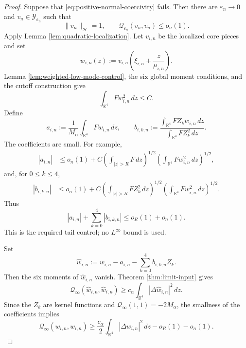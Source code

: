 \documentclass[11pt]{article}
\numberwithin{equation}{section}
\begin{document}
\begin{proof}
Suppose that \eqref{eq:positive-normal-coercivity} fails.  Then there
are $\varepsilon_n\to0$ and
$v_n\in\mathcal Y_{\varepsilon_n}$ such that
\begin{equation}\label{eq:normal-coercivity-contradiction}
\|v_n\|_{\mathcal H}=1,
\qquad
\mathcal Q_{\varepsilon_n}(v_n,v_n)\leq o_n(1).
\end{equation}
Apply Lemma \ref{lem:quadratic-localization}.  Let $v_{i,n}$ be the
localized core pieces and set
\begin{equation*}
w_{i,n}(z)
:=v_{i,n}\left(\xi_{i,n}+\frac z{\mu_{i,n}}\right).
\end{equation*}
Lemma \ref{lem:weighted-low-mode-control}, the six global moment
conditions, and the cutoff construction give
\begin{equation*}
\int_{\mathbb R^4}Fw_{i,n}^2\,dz\leq C.
\end{equation*}
Define
\begin{equation*}
a_{i,n}
:=\frac1{M_\alpha}\int_{\mathbb R^4}Fw_{i,n}\,dz,
\qquad
b_{i,k,n}
:=\frac{\int_{\mathbb R^4}FZ_kw_{i,n}\,dz}
{\int_{\mathbb R^4}FZ_k^2\,dz}.
\end{equation*}
The coefficients are small.  For example,
\begin{equation*}
\begin{aligned}
|a_{i,n}|
&\leq o_n(1)
+C\left(\int_{|z|>R}F\,dz\right)^{1/2}
\left(\int_{\mathbb R^4}Fw_{i,n}^2\,dz\right)^{1/2},
\end{aligned}
\end{equation*}
and, for $0\leq k\leq4$,
\begin{equation*}
\begin{aligned}
|b_{i,k,n}|
&\leq o_n(1)
+C\left(\int_{|z|>R}FZ_k^2\,dz\right)^{1/2}
\left(\int_{\mathbb R^4}Fw_{i,n}^2\,dz\right)^{1/2}.
\end{aligned}
\end{equation*}
Thus
\begin{equation*}
|a_{i,n}|+\sum_{k=0}^{4}|b_{i,k,n}|
\leq o_R(1)+o_n(1).
\end{equation*}
This is the required tail control; no $L^\infty$ bound is used.

Set
\begin{equation*}
\widehat w_{i,n}
:=w_{i,n}-a_{i,n}-\sum_{k=0}^{4}b_{i,k,n}Z_k.
\end{equation*}
Then the six moments of $\widehat w_{i,n}$ vanish.  Theorem
\ref{thm:limit-input} gives
\begin{equation*}
\mathcal Q_\infty(\widehat w_{i,n},\widehat w_{i,n})
\geq c_\alpha
\int_{\mathbb R^4}|\Delta\widehat w_{i,n}|^2\,dz.
\end{equation*}
Since the $Z_k$ are kernel functions and
$\mathcal Q_\infty(1,1)=-2M_\alpha$, the smallness of the coefficients
implies
\begin{equation}\label{eq:localized-direct-coercivity}
\mathcal Q_\infty(w_{i,n},w_{i,n})
\geq
\frac{c_\alpha}{2}
\int_{\mathbb R^4}|\Delta w_{i,n}|^2\,dz
-o_R(1)-o_n(1).
\end{equation}


\end{proof}
\end{document}
